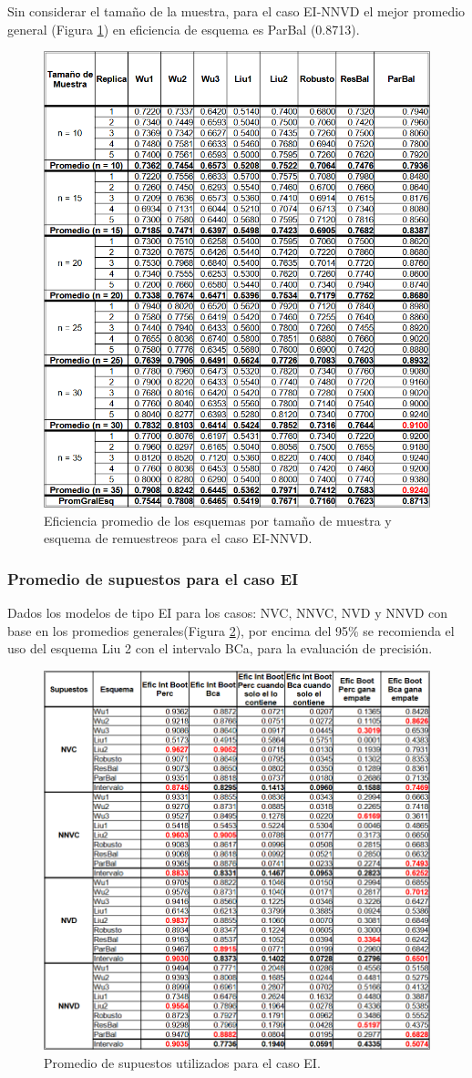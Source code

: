 Sin considerar el tamaño de la muestra, para el caso EI-NNVD el mejor promedio general (Figura \ref{fig:EficPromEsqTamMuesEsqRemuEI-NNVD}) en eficiencia de esquema es ParBal (0.8713).


\begin{figure}[ht] 
	\centering 
	\includegraphics[width=0.70\linewidth]{img/EI_NNVD_Efic_Esq.png} 
	\caption{Eficiencia promedio de los esquemas por tamaño de muestra y esquema de remuestreos para el caso EI-NNVD.} 
	\label{fig:EficPromEsqTamMuesEsqRemuEI-NNVD}
\end{figure}
\FloatBarrier



\subsubsection{Promedio de supuestos para el caso EI}
Dados los modelos de tipo EI para los casos: NVC, NNVC, NVD y NNVD con base en los promedios generales(Figura \ref{fig:PromSupuUtiliEI}), por encima del 95\% se recomienda el uso del esquema Liu 2 con el intervalo BCa, para la evaluación de precisión.


\begin{figure}[ht] 
	\centering 
	\includegraphics[width=0.80\linewidth]{img/EI_Prom_Supuestos.png} 
	\caption{Promedio de supuestos utilizados para el caso EI.} 
	\label{fig:PromSupuUtiliEI}
\end{figure}






